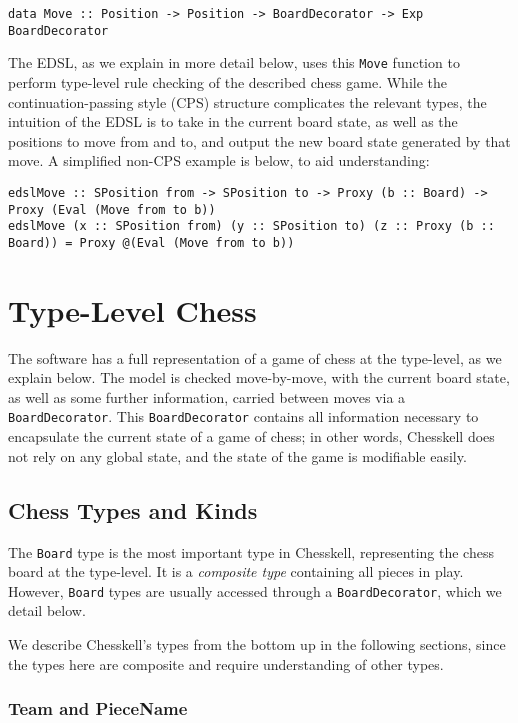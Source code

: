 \documentclass[12pt, a4paper, bibliography=totocnumbered]{scrreprt}
\newcommand{\inline}[1]{\lstinline[basicstyle=\ttfamily\footnotesize]{#1}}
\begin{document}
\begin{lstlisting}
data Move :: Position -> Position -> BoardDecorator -> Exp BoardDecorator
\end{lstlisting}

The EDSL, as we explain in more detail below, uses this \inline{Move} function to perform type-level rule checking of the described chess game. While the continuation-passing style (CPS) structure complicates the relevant types, the intuition of the EDSL is to take in the current board state, as well as the positions to move from and to, and output the new board state generated by that move. A simplified non-CPS example is below, to aid understanding:

\begin{lstlisting}
edslMove :: SPosition from -> SPosition to -> Proxy (b :: Board) -> Proxy (Eval (Move from to b))
edslMove (x :: SPosition from) (y :: SPosition to) (z :: Proxy (b :: Board)) = Proxy @(Eval (Move from to b))
\end{lstlisting}

\section{Type-Level Chess}

The software has a full representation of a game of chess at the type-level, as we explain below. The model is checked move-by-move, with the current board state, as well as some further information, carried between moves via a \inline{BoardDecorator}. This \inline{BoardDecorator} contains all information necessary to encapsulate the current state of a game of chess; in other words, Chesskell does not rely on any global state, and the state of the game is modifiable easily.

\subsection{Chess Types and Kinds}

The \inline{Board} type is the most important type in Chesskell, representing the chess board at the type-level. It is a \emph{composite type} containing all pieces in play. However, \inline{Board} types are usually accessed through a  \inline{BoardDecorator}, which we detail below.

We describe Chesskell's types from the bottom up in the following sections, since the types here are composite and require understanding of other types.

\subsubsection{Team and PieceName}
\end{document}
